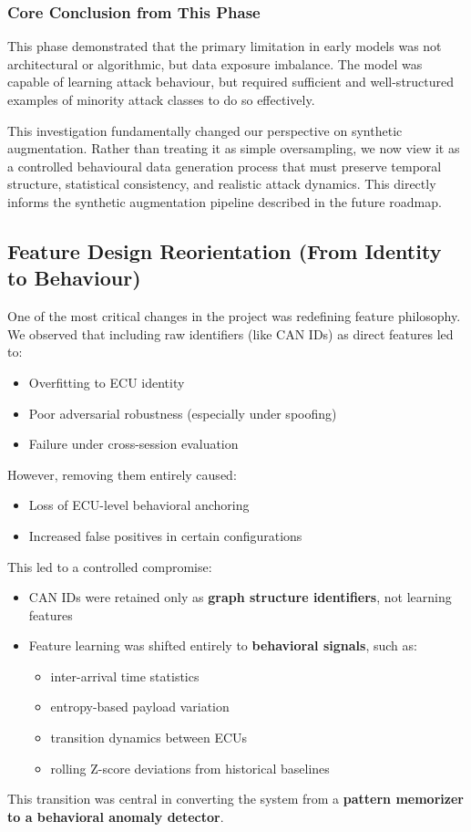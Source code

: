 \documentclass{article}
\begin{document}
\subsubsection{Core Conclusion from This Phase}
This phase demonstrated that the primary limitation in early models was not architectural or algorithmic, but data exposure imbalance. The model was capable of learning attack behaviour, but required sufficient and well-structured examples of minority attack classes to do so effectively.

This investigation fundamentally changed our perspective on synthetic augmentation. Rather than treating it as simple oversampling, we now view it as a controlled behavioural data generation process that must preserve temporal structure, statistical consistency, and realistic attack dynamics. This directly informs the synthetic augmentation pipeline described in the future roadmap.

\subsection{Feature Design Reorientation (From Identity to Behaviour)}
One of the most critical changes in the project was redefining feature philosophy.
We observed that including raw identifiers (like CAN IDs) as direct features led to:
\begin{itemize}[noitemsep]
    \item Overfitting to ECU identity
    \item Poor adversarial robustness (especially under spoofing)
    \item Failure under cross-session evaluation
\end{itemize}

However, removing them entirely caused:
\begin{itemize}[noitemsep]
    \item Loss of ECU-level behavioral anchoring
    \item Increased false positives in certain configurations
\end{itemize}

This led to a controlled compromise:
\begin{itemize}[noitemsep]
    \item CAN IDs were retained only as \textbf{graph structure identifiers}, not learning features
    \item Feature learning was shifted entirely to \textbf{behavioral signals}, such as:
    \begin{itemize}[noitemsep]
        \item inter-arrival time statistics
        \item entropy-based payload variation
        \item transition dynamics between ECUs
        \item rolling Z-score deviations from historical baselines
    \end{itemize}
\end{itemize}
This transition was central in converting the system from a \textbf{pattern memorizer to a behavioral anomaly detector}.
\end{document}
